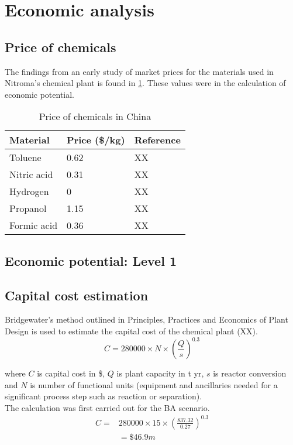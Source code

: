 \section{Economic analysis}
\label{app:economics}
\subsection{Price of chemicals}

The findings from an early study of market prices for the materials used in Nitroma's chemical plant is found in \cref{tab:material-prices}. These values were in the calculation of economic potential.

\begin{table}[h] %
\centering
\caption{Price of chemicals in China}
\label{tab:material-prices}
\begin{tabular}{lll}
    \toprule
    Material    & Price (\$/kg) & Reference \\ \midrule
    Toluene     & 0.62          & XX        \\
    Nitric acid & 0.31          & XX        \\
    Hydrogen    & 0             & XX        \\
    Propanol    & 1.15          & XX        \\
    Formic acid & 0.36          & XX        \\ \bottomrule
\end{tabular}
\end{table}

\subsection{Economic potential: Level 1}

\subsection{Capital cost estimation}

Bridgewater's method outlined in Principles, Practices and Economics of Plant Design is used to estimate the capital cost of the chemical plant (XX).
\begin{equation}
    C=280000 \times N \times \left(\frac{Q}{s}\right)^{0.3}
\end{equation}

\noindent where $C$ is capital cost in \$, $Q$ is  plant capacity in t yr, $s$ is reactor conversion and $N$ is number of functional units (equipment and ancillaries needed for a significant process step such as reaction or separation).\\
The calculation was first carried out for the BA scenario.
\begin{equation}
\begin{split} 
C=& 280000 \times 15 \times \left(\frac{837.32}{0.27}\right)^{0.3}  \\
 & =\$46.9m 
\end{split}
\end{equation}
    
